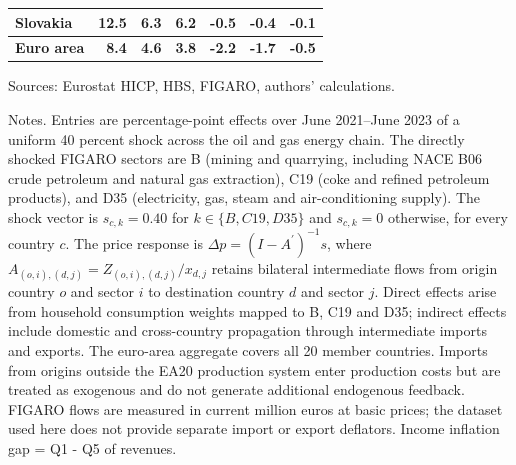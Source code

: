 \documentclass[11pt]{article}
\begin{document}
\begin{table}[H]
\begin{tabular}{lrrrrrr}
 \\
Slovakia & 12.5 & 6.3 & 6.2 & -0.5 & -0.4 & -0.1
 \\
\midrule
\textbf{Euro area} & \textbf{8.4} & \textbf{4.6} & \textbf{3.8} & \textbf{-2.2} & \textbf{-1.7} & \textbf{-0.5}
 \\
\bottomrule
\end{tabular}
\par\vspace{0.35em}\footnotesize\noindent Sources: Eurostat HICP, HBS, FIGARO, authors' calculations.
\par\vspace{0.25em}\footnotesize\noindent Notes. Entries are percentage-point effects over June 2021--June 2023 of a uniform 40 percent shock across the oil and gas energy chain. The directly shocked FIGARO sectors are B (mining and quarrying, including NACE B06 crude petroleum and natural gas extraction), C19 (coke and refined petroleum products), and D35 (electricity, gas, steam and air-conditioning supply). The shock vector is $s_{c,k}=0.40$ for $k\in\{B,C19,D35\}$ and $s_{c,k}=0$ otherwise, for every country $c$. The price response is $\Delta p = (I - A^{\prime})^{-1}s$, where $A_{(o,i),(d,j)}=Z_{(o,i),(d,j)}/x_{d,j}$ retains bilateral intermediate flows from origin country $o$ and sector $i$ to destination country $d$ and sector $j$. Direct effects arise from household consumption weights mapped to B, C19 and D35; indirect effects include domestic and cross-country propagation through intermediate imports and exports. The euro-area aggregate covers all 20 member countries. Imports from origins outside the EA20 production system enter production costs but are treated as exogenous and do not generate additional endogenous feedback. FIGARO flows are measured in current million euros at basic prices; the dataset used here does not provide separate import or export deflators. Income inflation gap = Q1 - Q5 of revenues.
\end{table}
\vspace{0.6em}
\end{document}
